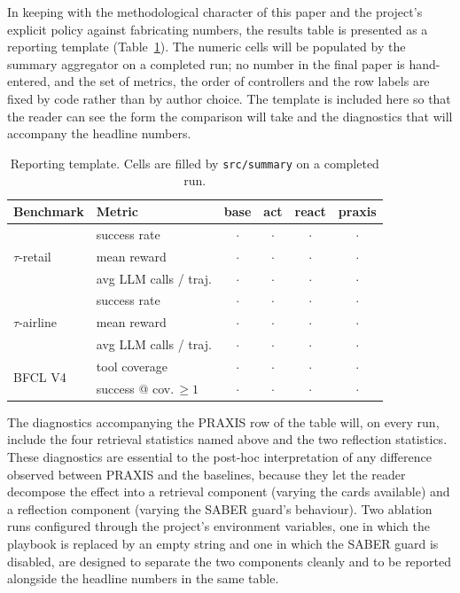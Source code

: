 \documentclass[conference]{IEEEtran}
\begin{document}
In keeping with the methodological character of this paper and
the project's explicit policy against fabricating numbers, the
results table is presented as a reporting template
(Table~\ref{tab:results-template}). The numeric cells will be
populated by the summary aggregator on a completed run; no number
in the final paper is hand-entered, and the set of metrics, the
order of controllers and the row labels are fixed by code rather
than by author choice. The template is included here so that the
reader can see the form the comparison will take and the
diagnostics that will accompany the headline numbers.

\begin{table}[t]
\caption{Reporting template. Cells are filled by
\texttt{src/summary} on a completed run.}
\label{tab:results-template}
\centering
\small
\begin{tabular}{@{}llcccc@{}}
\toprule
\textbf{Benchmark} & \textbf{Metric} & base & act & react & praxis \\
\midrule
\multirow{3}{*}{$\tau$-retail}
 & success rate          & $\cdot$ & $\cdot$ & $\cdot$ & $\cdot$ \\
 & mean reward           & $\cdot$ & $\cdot$ & $\cdot$ & $\cdot$ \\
 & avg LLM calls / traj. & $\cdot$ & $\cdot$ & $\cdot$ & $\cdot$ \\
\midrule
\multirow{3}{*}{$\tau$-airline}
 & success rate          & $\cdot$ & $\cdot$ & $\cdot$ & $\cdot$ \\
 & mean reward           & $\cdot$ & $\cdot$ & $\cdot$ & $\cdot$ \\
 & avg LLM calls / traj. & $\cdot$ & $\cdot$ & $\cdot$ & $\cdot$ \\
\midrule
\multirow{2}{*}{BFCL V4}
 & tool coverage         & $\cdot$ & $\cdot$ & $\cdot$ & $\cdot$ \\
 & success @ cov.\,$\ge 1$ & $\cdot$ & $\cdot$ & $\cdot$ & $\cdot$ \\
\bottomrule
\end{tabular}
\end{table}

The diagnostics accompanying the PRAXIS row of the table will, on
every run, include the four retrieval statistics named above and
the two reflection statistics. These diagnostics are essential to
the post-hoc interpretation of any difference observed between
PRAXIS and the baselines, because they let the reader decompose
the effect into a retrieval component (varying the cards
available) and a reflection component (varying the SABER guard's
behaviour). Two ablation runs configured through the project's
environment variables, one in which the playbook is replaced by
an empty string and one in which the SABER guard is disabled,
are designed to separate the two components cleanly and to be
reported alongside the headline numbers in the same table.
\end{document}
